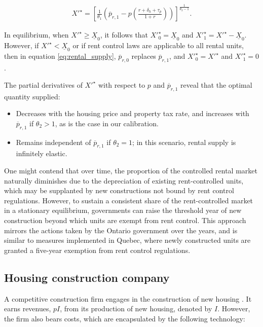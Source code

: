\documentclass[parskip=full]{article}
\begin{document}
\begin{align}\label{eq:rental_supply}
X'^{\star}=\left[\frac{1}{\theta_{1}}\left(\overline{p}_{r,1}-p\left(\frac{r+\delta_{h}+\tau_{p}}{1+r}\right)\right)\right]^{\frac{1}{\theta_{2}-1}}.
\end{align}

\noindent In equilibrium, when $X'^{\star} \geq \underline{X}_{0}$, it follows that $X'^{\star}_{0}=\underline{X}_{0}$ and $X'^{\star}_{1}=X'^{\star}-\underline{X}_{0}$. However, if $X'^{\star} < \underline{X}_{0}$ or if rent control laws are applicable to all rental units, then in equation \eqref{eq:rental_supply}, $\overline{p}_{r,0}$ replaces $\overline{p}_{r,1}$, and $X'^{\star}_{0}=X'^{\star}$ and $X'^{\star}_{1}=0$.

\noindent The partial derivatives of $X'^{\star}$ with respect to $p$ and $\overline{p}_{r,1}$ reveal that the optimal quantity supplied:

\begin{itemize}
    \item Decreases with the housing price and property tax rate, and increases with $\overline{p}_{r,1}$ if $\theta_{2} > 1$, as is the case in our calibration.
    \item Remains independent of $\overline{p}_{r,1}$ if $\theta_{2} = 1$; in this scenario, rental supply is infinitely elastic.
\end{itemize}

One might contend that over time, the proportion of the controlled rental market naturally diminishes due to the depreciation of existing rent-controlled units, which may be supplanted by new constructions not bound by rent control regulations. However, to sustain a consistent share of the rent-controlled market in a stationary equilibrium, governments can raise the threshold year of new construction beyond which units are exempt from rent control. This approach mirrors the actions taken by the Ontario government over the years, and is similar to measures implemented in Quebec, where newly constructed units are granted a five-year exemption from rent control regulations.

\subsection{Housing construction company}\label{sec:construction_company}

A competitive construction firm engages in the construction of new housing \citep{rotberg-2022}. It earns revenues, $pI$, from its production of new housing, denoted by $I$. However, the firm also bears costs, which are encapsulated by the following technology:
\end{document}
